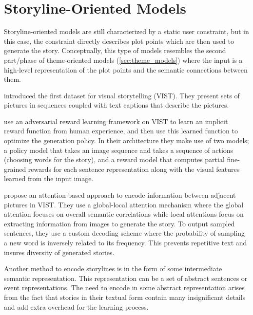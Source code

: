 
\section{Storyline-Oriented Models}
\label{sec:storyline_models}

Storyline-oriented models are still characterized by a static user constraint, but in this case, the constraint directly describes plot points which are then used to generate the story. Conceptually, this type of models resembles the second part/phase of theme-oriented models (\cref{sec:theme_models}) where the input is a high-level representation of the plot points and the semantic connections between them.

\citep{huang2016visual} introduced the first dataset for visual storytelling (VIST). They present sets of pictures in sequences coupled with text captions that describe the pictures.

\citep{wang2018no} use an adversarial reward learning framework on VIST to learn an implicit reward function from human experience, and then use this learned function to optimize the generation policy. In their architecture they make use of two models; a policy model that takes an image sequence and takes a sequence of actions (choosing words for the story), and a reward model that computes partial fine-grained rewards for each sentence representation along with the visual features learned from the input image.

\citep{kim2018glac} propose an attention-based approach to encode information between adjacent pictures in VIST. They use a global-local attention mechanism where the global attention focuses on overall semantic correlations while local attentions focus on extracting information from images to generate the story. To output sampled sentences, they use a custom decoding scheme where the probability of sampling a new word is inversely related to its frequency. This prevents repetitive text and insures diversity of generated stories.

Another method to encode storylines is in the form of some intermediate semantic representation. This representation can be a set of abstract sentences or event representations. The need to encode in some abstract representation arises from the fact that stories in their textual form contain many insignificant details and add extra overhead for the learning process. 


